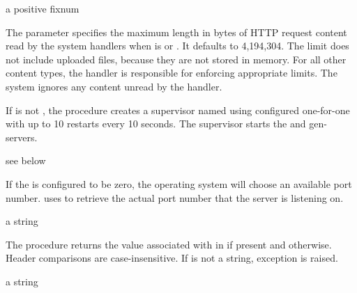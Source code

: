 \begin{parameter}
\end{parameter}
\hasvalue{} a positive fixnum

The  parameter specifies the maximum length
in bytes of HTTP request content read by the system handlers when
 is  or
. It defaults to
4,194,304. The limit does not include uploaded files, because they are
not stored in memory. For all other content types, the handler is
responsible for enforcing appropriate limits. The system ignores any
content unread by the handler.

\begin{procedure}
\end{procedure}
\returns{}
 \alt{} 

If  is not ,
the  procedure creates a supervisor named
 using  configured
one-for-one with up to 10 restarts every 10 seconds. The supervisor
starts the  and  gen-servers.

\begin{procedure}
\end{procedure}
\returns{} see below

If the  is configured to be zero, the
operating system will choose an available port
number.  uses
 to retrieve the actual port number that
the server is listening on.

\begin{procedure}
\end{procedure}
\returns{} a string \alt{} 

The  procedure returns the value associated
with  in  if present and 
otherwise. Header comparisons are case-insensitive. If  is
not a string, exception 
is raised.

\begin{procedure}
\end{procedure}
\returns{} a string

